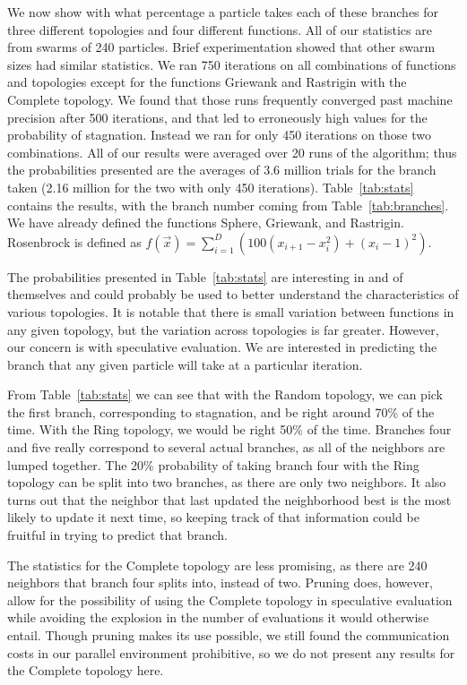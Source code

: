 \documentclass[journal,letterpaper]{IEEEtran}
\begin{document}
We now show with what percentage a particle takes each of these branches for
three different topologies and four different functions.  All of our statistics
are from swarms of 240 particles.  Brief experimentation showed that other
swarm sizes had similar statistics.  We ran 750 iterations on all combinations
of functions and topologies except for the functions Griewank and Rastrigin
with the Complete topology.  We found that those runs frequently converged past
machine precision after 500 iterations, and that led to erroneously high values
for the probability of stagnation.  Instead we ran for only 450 iterations on
those two combinations.  All of our results were averaged over 20 runs of the
algorithm; thus the probabilities presented are the averages of 3.6 million
trials for the branch taken (2.16 million for the two with only 450
iterations).  Table~\ref{tab:stats} contains the results, with the branch
number coming from Table~\ref{tab:branches}.  We have already defined the
functions Sphere, Griewank, and Rastrigin.  Rosenbrock is defined as
$f(\Vec{x}) = \sum_{i=1}^D \left(100(x_{i+1}-x_i^2)+(x_i-1)^2\right)$.

The probabilities presented in Table~\ref{tab:stats} are interesting in and of
themselves and could probably be used to better understand the characteristics
of various topologies.  It is notable that there is small variation between
functions in any given topology, but the variation across topologies is far
greater.  However, our concern is with speculative evaluation.  We are
interested in predicting the branch that any given particle will take at a
particular iteration.

From Table~\ref{tab:stats} we can see that with the Random topology, we can
pick the first branch, corresponding to stagnation, and be right around 70\% of
the time.  With the Ring topology, we would be right 50\% of the time.
Branches four and five really correspond to several actual branches, as all of
the neighbors are lumped together.  The 20\% probability of taking branch four
with the Ring topology can be split into two branches, as there are only two
neighbors.  It also turns out that the neighbor that last updated the
neighborhood best is the most likely to update it next time, so keeping track
of that information could be fruitful in trying to predict that branch.

The statistics for the Complete topology are less promising, as there are 240
neighbors that branch four splits into, instead of two.  Pruning does, however,
allow for the possibility of using the Complete topology in speculative
evaluation while avoiding the explosion in the number of evaluations it would
otherwise entail.  Though pruning makes its use possible, we still found the
communication costs in our parallel environment prohibitive, so we do not
present any results for the Complete topology here.
\end{document}
